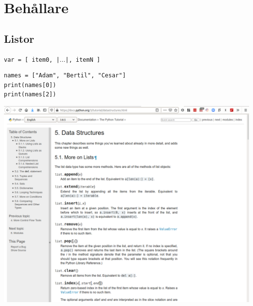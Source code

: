 \mode*

\section{Behållare}

\subsection{Listor}

\begin{frame}[fragile]
  \texttt{var = [ item0, |$\dotsc$|, itemN ]}
\end{frame}

\begin{frame}[fragile]
  \begin{example}
    \begin{verbatim}
names = ["Adam", "Bertil", "Cesar"]
print(names[0])
print(names[2])
    \end{verbatim}
  \end{example}
\end{frame}

\begin{frame}
  \includegraphics[width=\columnwidth]{figs/docs-lists.png}
\end{frame}

\begin{frame}[fragile]
  \begin{example}
    \inputminted{python}{examples/extend_lists.py}
  \end{example}
\end{frame}

